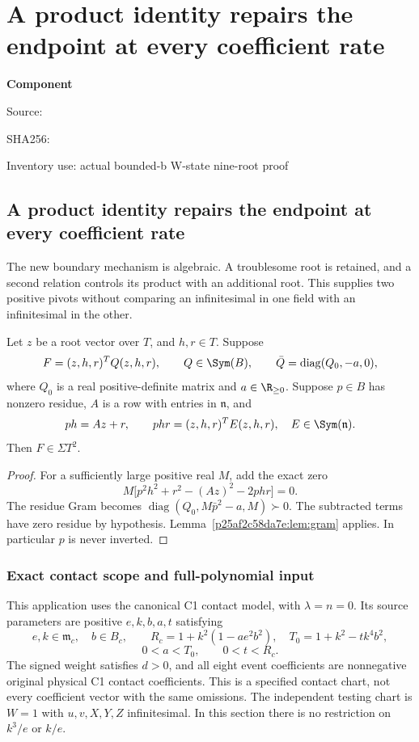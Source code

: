 \chapter{A product identity repairs the endpoint at every coefficient rate}
\label{component:p05180564ed05}
\noindent\textbf{Component }\par
{\small\noindent Source: \par}
{\small\noindent SHA256: \par}
{\small\noindent Inventory use: actual bounded-b W-state nine-root proof\par}
\medskip
\section{A product identity repairs the endpoint at every coefficient rate}\label{p05180564ed05:sec:productrepair}
The new boundary mechanism is algebraic. A troublesome root is retained, and a second relation controls its product with an additional root. This supplies two positive pivots without comparing an infinitesimal in one field with an infinitesimal in the other.

\begin{lemma}\label{p05180564ed05:lem:productrepair}
Let $z$ be a root vector over $T$, and $h,r\in T$. Suppose
\[
F=(z,h,r)^TQ(z,h,r),\qquad Q\in\Sym(B),\qquad
\bar Q=\operatorname{diag}(Q_0,-a,0),
\]
where $Q_0$ is a real positive-definite matrix and $a\in\R_{\ge0}$. Suppose $p\in B$ has nonzero residue, $A$ is a row with entries in $\mathfrak n$, and
\[
ph=Az+r,\qquad phr=(z,h,r)^TE(z,h,r),\quad E\in\Sym(\mathfrak n).
\]
Then $F\in\Sigma T^2$.
\end{lemma}
\begin{proof}
For a sufficiently large positive real $M$, add the exact zero
\[
M\big[p^2h^2+r^2-(Az)^2-2phr\big]=0.
\]
The residue Gram becomes $\operatorname{diag}(Q_0,M\bar p^2-a,M)\succ0$. The subtracted terms have zero residue by hypothesis. Lemma~\ref{p25af2c58da7e:lem:gram} applies. In particular $p$ is never inverted.
\end{proof}

\subsection{Exact contact scope and full-polynomial input}
This application uses the canonical C1 contact model, with $\lambda=n=0$. Its source parameters are positive $e,k,b,a,t$ satisfying
\[
e,k\in\mathfrak m_c,\quad b\in B_c,\qquad
R_c=1+k^2(1-ae^2b^2),\quad T_0=1+k^2-tk^4b^2,
\]
\[
0<a<T_0,\qquad0<t<R_c.
\]
The signed weight satisfies $d>0$, and all eight event coefficients are nonnegative original physical C1 contact coefficients. This is a specified contact chart, not every coefficient vector with the same omissions. The independent testing chart is $W=1$ with $u,v,X,Y,Z$ infinitesimal. In this section there is no restriction on $k^3/e$ or $k/e$.

